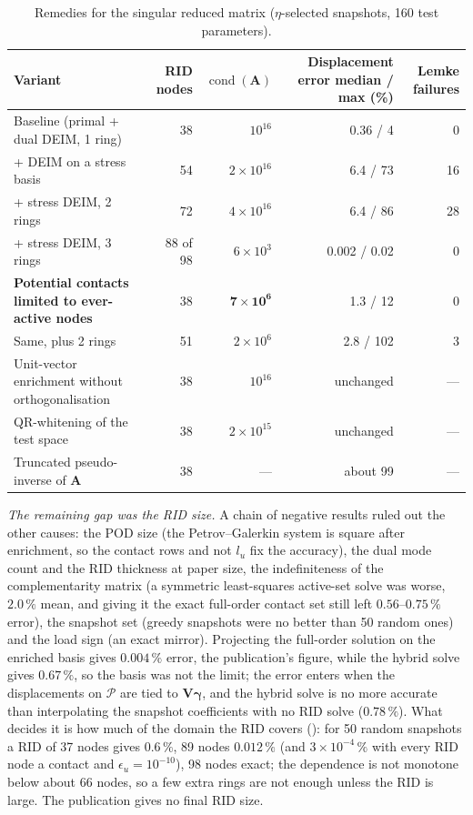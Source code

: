 \begin{table}[tbp]
\centering\footnotesize
\caption{Remedies for the singular reduced matrix ($\eta$-selected snapshots, 160 test parameters).}\label{tab:vf-hb-sing}
\begin{tabular}{@{}lrrrr@{}}
\toprule
Variant & RID nodes & $\operatorname{cond}(\mathbf A)$ & Displacement error median / max (\%) & Lemke failures\\
\midrule
Baseline (primal + dual DEIM, 1 ring) & 38 & $10^{16}$ & 0.36 / 4 & 0\\
+ DEIM on a stress basis & 54 & $2\times10^{16}$ & 6.4 / 73 & 16\\
+ stress DEIM, 2 rings & 72 & $4\times10^{16}$ & 6.4 / 86 & 28\\
+ stress DEIM, 3 rings & 88 of 98 & $6\times10^{3}$ & 0.002 / 0.02 & 0\\
\textbf{Potential contacts limited to ever-active nodes} & 38 & $\mathbf{7\times10^{6}}$ & 1.3 / 12 & 0\\
Same, plus 2 rings & 51 & $2\times10^{6}$ & 2.8 / 102 & 3\\
Unit-vector enrichment without orthogonalisation & 38 & $10^{16}$ & unchanged & ---\\
QR-whitening of the test space & 38 & $2\times10^{15}$ & unchanged & ---\\
Truncated pseudo-inverse of $\mathbf A$ & 38 & --- & about 99 & ---\\
\bottomrule
\end{tabular}
\end{table}

\emph{The remaining gap was the RID size.} A chain of negative results ruled out the other causes: the POD size (the Petrov--Galerkin system is square after enrichment, so the contact rows and not $l_u$ fix the accuracy), the dual mode count and the RID thickness at paper size, the indefiniteness of the complementarity matrix (a symmetric least-squares active-set solve was worse, $2.0\,\%$ mean, and giving it the exact full-order contact set still left $0.56$--$0.75\,\%$ error), the snapshot set (greedy snapshots were no better than 50 random ones) and the load sign (an exact mirror). Projecting the full-order solution on the enriched basis gives $0.004\,\%$ error, the publication's figure, while the hybrid solve gives $0.67\,\%$, so the basis was not the limit; the error enters when the displacements on $\mathcal P$ are tied to $\mathbf V\boldsymbol\gamma$, and the hybrid solve is no more accurate than interpolating the snapshot coefficients with no RID solve ($0.78\,\%$). What decides it is how much of the domain the RID covers (): for 50 random snapshots a RID of 37 nodes gives $0.6\,\%$, 89 nodes $0.012\,\%$ (and $3\times10^{-4}\,\%$ with every RID node a contact and $\epsilon_u=10^{-10}$), 98 nodes exact; the dependence is not monotone below about 66 nodes, so a few extra rings are not enough unless the RID is large. The publication gives no final RID size.

